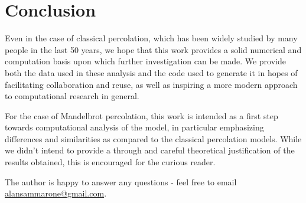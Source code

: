 \section{Conclusion}

Even in the case of classical percolation, which has been widely studied by many people in the last 50 years, we hope that this work provides a solid numerical and computation basis upon which further investigation can be made. We provide both the data used in these analysis and the code used to generate it in hopes of facilitating collaboration and reuse, as well as inspiring a more modern approach to computational research in general. 

For the case of Mandelbrot percolation, this work is intended as a first step towards computational analysis of the model, in particular emphasizing differences and similarities as compared to the classical percolation models. While we didn't intend to provide a through and careful theoretical justification of the results obtained, this is encouraged for the curious reader. 

The author is happy to answer any questions - feel free to email \url{alansammarone@gmail.com}.
